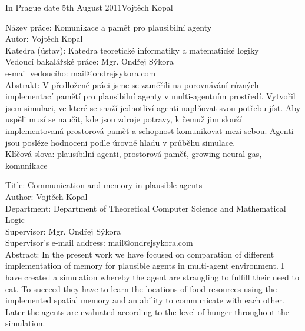 \documentclass[12pt,a4paper]{report}
\begin{document}
\bigskip
\noindent In Prague date 5th August 2011\hspace{\fill}Vojtěch Kopal\\ %


\setcounter{tocdepth}{1}
\tableofcontents %

\newpage %

\noindent
Název práce: Komunikace a pamě\v{t} pro plausibilní agenty\\
Autor: Vojtěch Kopal\\
Katedra (ústav): Katedra teoretické informatiky a matematické logiky\\
Vedoucí bakalářské práce: Mgr. Ondřej Sýkora\\
e-mail vedoucího: mail@ondrejsykora.com\\

\noindent Abstrakt:  V předložené práci jsme se zaměřili na porovnávání různých implementací pamětí pro plausibilní agenty v multi-agentním prostředí. Vytvořil jsem simulaci, ve které se snaží jednotliví agenti naplňovat svou potřebu jíst. Aby uspěli musí se naučit, kde jsou zdroje potravy, k čemuž jim slouží implementovaná prostorová paměť a schopnost komunikovat mezi sebou. Agenti jsou posléze hodnoceni podle úrovně hladu v průběhu simulace. \\

\noindent Klíčová slova: plausibilní agenti, prostorová paměť, growing neural gas, komunikace

\vspace{10mm}

\noindent
Title: Communication and memory in plausible agents\\
Author: Vojtěch Kopal\\
Department: Department of Theoretical Computer Science and Mathematical Logic\\
Supervisor: Mgr. Ondřej Sýkora\\
Supervisor's e-mail address: mail@ondrejsykora.com\\

\noindent Abstract: In the present work we have focused on comparation of different implementation of memory for plausible agents in multi-agent environment. I have created a simulation whereby the agent are strangling to fulfill their need to eat. To succeed they have to learn the locations of food resources using the implemented spatial memory and an ability to communicate with each other. Later the agents are evaluated according to the level of hunger throughout the simulation.\\
\end{document}
